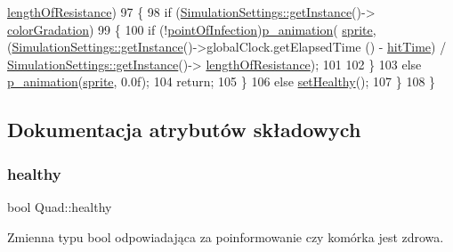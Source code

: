 \begin{DoxyCode}
      \mbox{\hyperlink{class_simulation_settings_a1c7091242ba583df542bd22643ccc509}{lengthOfResistance}})
97         \{
98             \textcolor{keywordflow}{if} (\mbox{\hyperlink{class_simulation_settings_ab69bcd8bb611656b17d1f655d09a3004}{SimulationSettings::getInstance}}()->
      \mbox{\hyperlink{class_simulation_settings_a131a5c0b576e510b4c61c3c19b0efe81}{colorGradation}})
99             \{
100                 \textcolor{keywordflow}{if} (!\mbox{\hyperlink{class_quad_a033c364211aab4e91aeb1609d4d890fe}{pointOfInfection}})\mbox{\hyperlink{class_quad_ace5b5f07a650f624aeb07806bc34d3f6}{p\_animation}}(
      \mbox{\hyperlink{class_quad_a83667bb824c1d6eca6c9c8b6e6d07d06}{sprite}}, (\mbox{\hyperlink{class_simulation_settings_ab69bcd8bb611656b17d1f655d09a3004}{SimulationSettings::getInstance}}()->globalClock.getElapsedTime
      () - \mbox{\hyperlink{class_quad_a30c2f4952b357ab59f018b766d2c9da2}{hitTime}}) / \mbox{\hyperlink{class_simulation_settings_ab69bcd8bb611656b17d1f655d09a3004}{SimulationSettings::getInstance}}()->
      \mbox{\hyperlink{class_simulation_settings_a1c7091242ba583df542bd22643ccc509}{lengthOfResistance}});
101 
102             \}
103             \textcolor{keywordflow}{else} \mbox{\hyperlink{class_quad_ace5b5f07a650f624aeb07806bc34d3f6}{p\_animation}}(\mbox{\hyperlink{class_quad_a83667bb824c1d6eca6c9c8b6e6d07d06}{sprite}}, 0.0f);
104             \textcolor{keywordflow}{return};
105         \}
106         \textcolor{keywordflow}{else} \mbox{\hyperlink{class_quad_a3b6d55ec11182c7151bb3894ab397204}{setHealthy}}();
107     \}
108 \}
\end{DoxyCode}


\subsection{Dokumentacja atrybutów składowych}
\mbox{\label{class_quad_a4994c09af588aeb08c482ea46494a08c}} 
\subsubsection{\texorpdfstring{healthy}{healthy}}
{\footnotesize\ttfamily bool Quad\+::healthy}

Zmienna typu bool odpowiadająca za poinformowanie czy komórka jest zdrowa. \mbox{\label{class_quad_a30c2f4952b357ab59f018b766d2c9da2}} 
